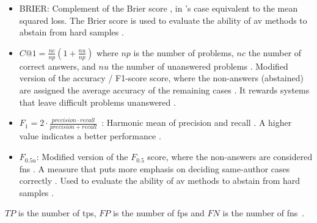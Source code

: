 \begin{itemize}
    \item BRIER: Complement of the Brier score \citep{bevendorff_overview_2024,weerasinghe_feature_vector_difference_2021}, 
    in \citet{bevendorff_overview_2024}'s case equivalent to the mean squared loss.
    The Brier score is used to evaluate the ability of \ac{av} methods to abstain from hard samples \citep{tyo_state_2022}.
    
    \item $C@1 = \frac{nc}{np}(1+\frac{nu}{np})$ where $np$ is the number of problems, $nc$ the number of correct answers, 
    and $nu$ the number of unanswered problems \citep{kocher_unine_2015}. 
    Modified version of the accuracy \citep{bevendorff_overview_2024}/ F1-score \citep{weerasinghe_feature_vector_difference_2021} score, 
    where the non-answers (abstained) \citep{llm_detection_av_2025} are assigned the average accuracy of the remaining cases \citep{bevendorff_overview_2024}. 
    It rewards systems that leave difficult problems unanswered \citep{weerasinghe_feature_vector_difference_2021}.
    
    \item $F_1 = 2 \cdot \frac{precision \cdot recall}{precision + recall}$~\citep{neal_surveying_2018}: Harmonic mean of precision and recall \citep{bevendorff_overview_2024,weerasinghe_feature_vector_difference_2021}.
    A higher value indicates a better performance \citep{neal_surveying_2018}.
    
    \item $F_{0.5u}$: Modified version of the $F_{0.5}$ score, where the non-answers are considered \acp{fn} \citep{bevendorff_overview_2024}. 
    A measure that puts more emphasis on deciding same-author cases correctly \citep{weerasinghe_feature_vector_difference_2021}.
    Used to evaluate the ability of \ac{av} methods to abstain from hard samples \citep{tyo_state_2022}.
\end{itemize}
$TP$ is the number of \aclp{tp}, $FP$ is the number of \aclp{fp} 
and $FN$ is the number of \aclp{fn}~\citep{chen_web_2008}.






